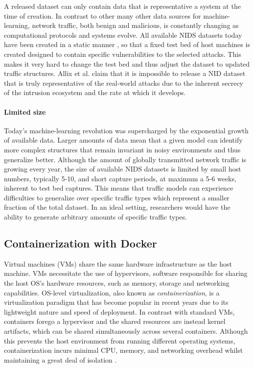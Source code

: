 A released dataset can only contain data that is representative a system at the time of creation. In contrast to other many other data sources for machine-learning, network traffic, both benign and malicious, is constantly changing as computational protocols and systems evolve. All available NIDS datasets today have been created in a static manner , so that a fixed test bed of host machines is created designed to contain specific vulnerabilities to the selected attacks. This makes it very hard to change the test bed and thus adjust the dataset to updated traffic structures. Allix et al. \cite{allix2014machine} claim that it is impossible to release a NID dataset that is truly representative of the real-world attacks due to the inherent secrecy of the intrusion ecosystem and the rate at which it develops.


\paragraph{Limited size}
Today's machine-learning revolution was supercharged by the exponential growth of available data. Larger amounts of data mean that a given model can identify more complex structures that remain invariant in noisy environments and thus generalize better. Although the amount of globally transmitted network traffic is growing every year, the size of available NIDS datasets is limited by small host numbers, typically 5-10, and short capture periods, at maximum a 5-6 weeks, inherent to test bed captures. This means that traffic models can experience difficulties to generalize over specific traffic types which represent a smaller fraction of the total dataset. In an ideal setting, researchers would have the ability to generate arbitrary amounts of specific traffic types.


\subsection{Containerization with Docker}
Virtual machines (VMs) share the same hardware infrastructure as the host machine. VMs necessitate the use of hypervisors, software responsible for sharing the host OS's hardware resources, such as memory, storage and networking capabilities. OS-level virtualization, also known as \textit{containerization}, is a virtualization paradigm that has become popular in recent years due to its lightweight nature and speed of deployment. 
In contrast with standard VMs, containers forego a hypervisor and the shared resources are instead kernel artifacts, which can be shared simultaneously across several containers. Although this prevents the host environment from running different operating systems, containerization incurs minimal CPU, memory, and networking overhead whilst maintaining a great deal of isolation \cite{kolyshkin2006virtualization}. 
 

